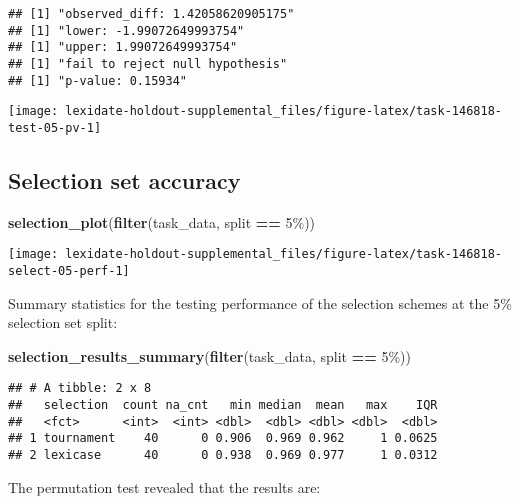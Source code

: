 \documentclass[
]{book}
\newenvironment{Shaded}{\begin{snugshade}}{\end{snugshade}}
\newcommand{\FunctionTok}[1]{\textcolor[rgb]{0.13,0.29,0.53}{\textbf{#1}}}
\newcommand{\NormalTok}[1]{#1}
\newcommand{\SpecialCharTok}[1]{\textcolor[rgb]{0.81,0.36,0.00}{\textbf{#1}}}
\newcommand{\StringTok}[1]{\textcolor[rgb]{0.31,0.60,0.02}{#1}}
\begin{document}
\begin{verbatim}
## [1] "observed_diff: 1.42058620905175"
## [1] "lower: -1.99072649993754"
## [1] "upper: 1.99072649993754"
## [1] "fail to reject null hypothesis"
## [1] "p-value: 0.15934"
\end{verbatim}

\texttt{[image: lexidate-holdout-supplemental\_files/figure-latex/task-146818-test-05-pv-1]}

\hypertarget{selection-set-accuracy}{%
\subsection{Selection set accuracy}\label{selection-set-accuracy}}

\begin{Shaded}
\begin{Highlighting}[]
\FunctionTok{selection\_plot}\NormalTok{(}\FunctionTok{filter}\NormalTok{(task\_data, split }\SpecialCharTok{==} \StringTok{\textquotesingle{}5\%\textquotesingle{}}\NormalTok{))}
\end{Highlighting}
\end{Shaded}

\texttt{[image: lexidate-holdout-supplemental\_files/figure-latex/task-146818-select-05-perf-1]}

Summary statistics for the testing performance of the selection schemes at the 5\% selection set split:

\begin{Shaded}
\begin{Highlighting}[]
\FunctionTok{selection\_results\_summary}\NormalTok{(}\FunctionTok{filter}\NormalTok{(task\_data, split }\SpecialCharTok{==} \StringTok{\textquotesingle{}5\%\textquotesingle{}}\NormalTok{))}
\end{Highlighting}
\end{Shaded}

\begin{verbatim}
## # A tibble: 2 x 8
##   selection  count na_cnt   min median  mean   max    IQR
##   <fct>      <int>  <int> <dbl>  <dbl> <dbl> <dbl>  <dbl>
## 1 tournament    40      0 0.906  0.969 0.962     1 0.0625
## 2 lexicase      40      0 0.938  0.969 0.977     1 0.0312
\end{verbatim}

The permutation test revealed that the results are:
\end{document}
